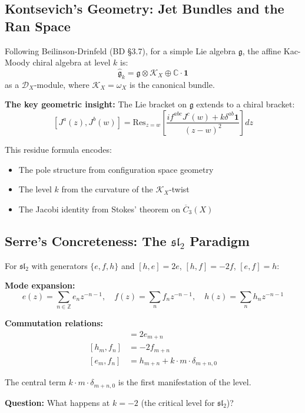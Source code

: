 \subsection{Kontsevich's Geometry: Jet Bundles and the Ran Space}

\begin{construction}
Following Beilinson-Drinfeld (BD §3.7), for a simple Lie algebra $\mathfrak{g}$, the affine Kac-Moody chiral algebra at level $k$ is:
$$\widehat{\mathfrak{g}}_k = \mathfrak{g} \otimes \mathcal{K}_X \oplus \mathbb{C} \cdot \mathbf{1}$$
as a $\mathcal{D}_X$-module, where $\mathcal{K}_X = \omega_X$ is the canonical bundle.

\textbf{The key geometric insight:} The Lie bracket on $\mathfrak{g}$ extends to a chiral bracket:
$$[J^a(z), J^b(w)] = \text{Res}_{z=w}\left[\frac{if^{abc}J^c(w) + k\delta^{ab}\mathbf{1}}{(z-w)^2}\right] dz$$

This residue formula encodes:
\begin{itemize}
\item The pole structure from configuration space geometry
\item The level $k$ from the curvature of the $\mathcal{K}_X$-twist
\item The Jacobi identity from Stokes' theorem on $\overline{C}_3(X)$
\end{itemize}
\end{construction}

\subsection{Serre's Concreteness: The $\mathfrak{sl}_2$ Paradigm}

\begin{example}
For $\mathfrak{sl}_2$ with generators $\{e, f, h\}$ and $[h,e] = 2e$, $[h,f] = -2f$, $[e,f] = h$:

\textbf{Mode expansion:}
$$e(z) = \sum_{n \in \mathbb{Z}} e_n z^{-n-1}, \quad f(z) = \sum_{n} f_n z^{-n-1}, \quad h(z) = \sum_n h_n z^{-n-1}$$

\textbf{Commutation relations:}
\begin{align*}
[h_m, e_n] &= 2e_{m+n} \\
[h_m, f_n] &= -2f_{m+n} \\
[e_m, f_n] &= h_{m+n} + k \cdot m \cdot \delta_{m+n,0}
\end{align*}

The central term $k \cdot m \cdot \delta_{m+n,0}$ is the first manifestation of the level.

\textbf{Question:} What happens at $k = -2$ (the critical level for $\mathfrak{sl}_2$)?
\end{example}


